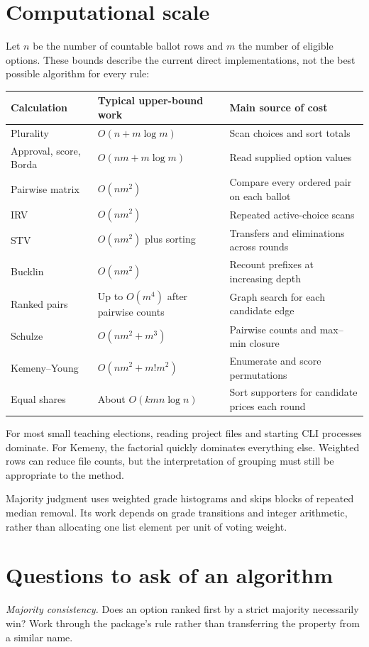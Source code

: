 \section{Computational scale}
Let $n$ be the number of countable ballot rows and $m$ the number of eligible options. These bounds describe the current direct implementations, not the best possible algorithm for every rule:
\begin{longtable}{p{.28\linewidth}p{.24\linewidth}p{.38\linewidth}}
\toprule Calculation & Typical upper-bound work & Main source of cost\\\midrule\endhead
Plurality & $O(n+m\log m)$ & Scan choices and sort totals\\
Approval, score, Borda & $O(nm+m\log m)$ & Read supplied option values\\
Pairwise matrix & $O(nm^2)$ & Compare every ordered pair on each ballot\\
IRV & $O(nm^2)$ & Repeated active-choice scans\\
STV & $O(nm^2)$ plus sorting & Transfers and eliminations across rounds\\
Bucklin & $O(nm^2)$ & Recount prefixes at increasing depth\\
Ranked pairs & Up to $O(m^4)$ after pairwise counts & Graph search for each candidate edge\\
Schulze & $O(nm^2+m^3)$ & Pairwise counts and max--min closure\\
Kemeny--Young & $O(nm^2+m!m^2)$ & Enumerate and score permutations\\
Equal shares & About $O(kmn\log n)$ & Sort supporters for candidate prices each round\\
\bottomrule
\end{longtable}
For most small teaching elections, reading project files and starting CLI processes dominate. For Kemeny, the factorial quickly dominates everything else. Weighted rows can reduce file counts, but the interpretation of grouping must still be appropriate to the method.

Majority judgment uses weighted grade histograms and skips blocks of repeated median removal. Its work depends on grade transitions and integer arithmetic, rather than allocating one list element per unit of voting weight.

\section{Questions to ask of an algorithm}
\emph{Majority consistency.} Does an option ranked first by a strict majority necessarily win? Work through the package's rule rather than transferring the property from a similar name.

